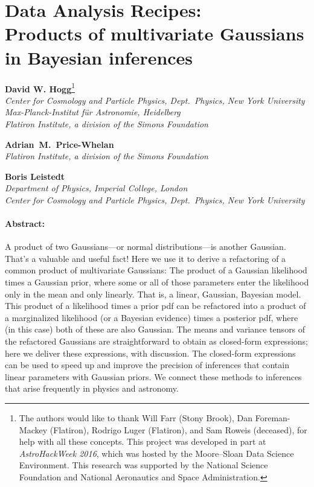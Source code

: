 \newcommand{\todo}[2]{\textcolor{BrickRed}{[#1 TODO: #2]}}
\newcommand{\apw}[1]{\textcolor{CadetBlue}{[APW says: #1]}}
\newcommand{\bl}[1]{\textcolor{red}{[BL says: #1]}}
\newcommand{\hogg}[1]{\textcolor{magenta}{[Hogg says: #1]}}



\section*{Data Analysis Recipes:\\
  Products of multivariate Gaussians\\
  in Bayesian inferences}

\noindent\textbf{David W. Hogg}\footnote{%
  The authors would like to thank
  Will Farr (Stony Brook),
  Dan Foreman-Mackey (Flatiron),
  Rodrigo Luger (Flatiron), and
  Sam Roweis (deceased),
  for help with all these concepts.
  This project was developed
  in part at \textsl{AstroHackWeek 2016}, which was
  hosted by the Moore--Sloan Data Science Environment.
  This research was supported by the National Science Foundation and National Aeronautics and Space Administration.
}\\
{\footnotesize%
  \textsl{Center for Cosmology and Particle Physics, Dept.\ Physics, New York University}\\
  \textsl{Max-Planck-Institut f\"ur Astronomie, Heidelberg}\\
  \textsl{Flatiron Institute, a division of the Simons Foundation}%
}

\medskip\noindent\textbf{Adrian~M.~Price-Whelan}\\
{\footnotesize%
  \textsl{Flatiron Institute, a division of the Simons Foundation}%
}

\medskip\noindent\textbf{Boris Leistedt}\\
{\footnotesize%
  \textsl{Department of Physics, Imperial College, London}\\
  \textsl{Center for Cosmology and Particle Physics, Dept.\ Physics, New York University}%
}

\paragraph{Abstract:}
A product of two Gaussians---or normal distributions---is another Gaussian.
That's a valuable and useful fact!
Here we use it to derive a refactoring of a common product of
multivariate Gaussians:
The product of a Gaussian likelihood times a Gaussian prior, where some or all
of those parameters enter the likelihood only in the mean and only linearly.
That is, a linear, Gaussian, Bayesian model.
This product of a likelihood times a prior pdf can be refactored into a product of a
marginalized likelihood (or a Bayesian evidence) times a posterior pdf, where
(in this case) both of these are also Gaussian.
The means and variance tensors of the refactored Gaussians are straightforward
to obtain as closed-form expressions;
here we deliver these expressions, with discussion.
The closed-form expressions can be used to speed up and improve the precision
of inferences that contain linear parameters with Gaussian priors.
We connect these methods to inferences that arise frequently in physics
and astronomy.

